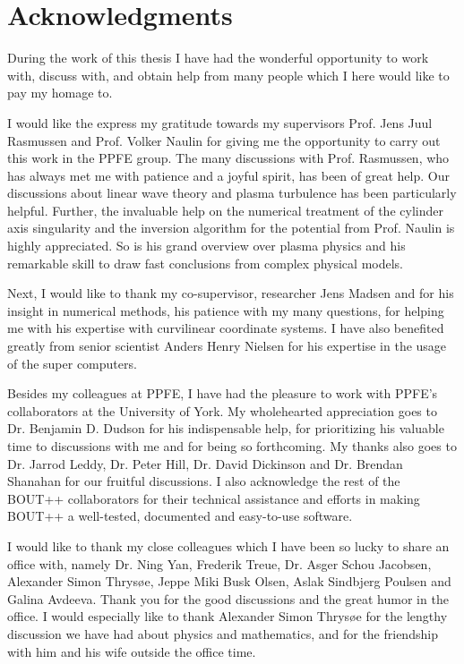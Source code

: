 \chapter*{Acknowledgments}
%
During the work of this thesis I have had the wonderful opportunity to work with, discuss with, and obtain help from many people which I here would like to pay my homage to.

I would like the express my gratitude towards my supervisors Prof. Jens Juul Rasmussen and Prof. Volker Naulin for giving me the opportunity to carry out this work in the PPFE group.
The many discussions with Prof. Rasmussen, who has always met me with patience and a joyful spirit, has been of great help.
Our discussions about linear wave theory and plasma turbulence has been particularly helpful.
Further, the invaluable help on the numerical treatment of the cylinder axis singularity and the inversion algorithm for the potential from Prof. Naulin is highly appreciated.
So is his grand overview over plasma physics and his remarkable skill to draw fast conclusions from complex physical models.

Next, I would like to thank my co-supervisor, researcher Jens Madsen and for his insight in numerical methods, his patience with my many questions, for helping me with his expertise with curvilinear coordinate systems.
I have also benefited greatly from senior scientist Anders Henry Nielsen for his expertise in the usage of the super computers.

Besides my colleagues at PPFE, I have had the pleasure to work with PPFE's collaborators at the University of York.
My wholehearted appreciation goes to Dr. Benjamin D. Dudson for his indispensable help, for prioritizing his valuable time to discussions with me and for being so forthcoming.
My thanks also goes to Dr. Jarrod Leddy, Dr. Peter Hill, Dr. David Dickinson and Dr. Brendan Shanahan for our fruitful discussions.
I also acknowledge the rest of the BOUT++ collaborators for their technical assistance and efforts in making BOUT++ a well-tested, documented and easy-to-use software.

I would like to thank my close colleagues which I have been so lucky to share an office with, namely Dr. Ning Yan, Frederik Treue, Dr. Asger Schou Jacobsen, Alexander Simon Thrys{\o}e, Jeppe Miki Busk Olsen, Aslak Sindbjerg Poulsen and Galina Avdeeva. Thank you for the good discussions and the great humor in the office.
I would especially like to thank Alexander Simon Thrys{\o}e for the lengthy discussion we have had about physics and mathematics, and for the friendship with him and his wife outside the office time.

